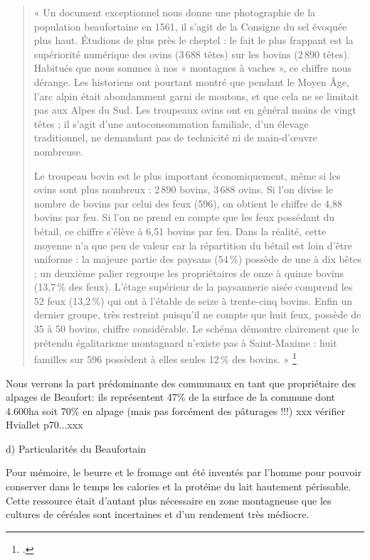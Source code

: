 \documentclass[12pt,a4paper]{report}
\begin{document}
	\begin{quote}
	« Un document exceptionnel nous donne une photographie de la population 
	beaufortaine en 1561, il s’agit de la Consigne du sel évoquée plus haut. 
	Étudions de plus près le cheptel : le fait le plus frappant est la supériorité 
	numérique des ovins (3\,688 têtes) sur les bovins (2\,890 têtes). Habitués que 
	nous sommes à nos « montagnes à vaches », ce chiffre nous dérange. Les historiens 
	ont pourtant montré que pendant le Moyen Âge, l’arc alpin était abondamment garni 
	de moutons, et que cela ne se limitait pas aux Alpes du Sud. Les troupeaux ovins 
	ont en général moins de vingt têtes ; il s’agit d’une autoconsommation familiale, 
	d’un élevage traditionnel, ne demandant pas de technicité ni de main-d’œuvre 
	nombreuse.
	
	Le troupeau bovin est le plus important économiquement, même si les ovins sont 
	plus nombreux : 2\,890 bovins, 3\,688 ovins. Si l’on divise le nombre de bovins 
	par celui des feux (596), on obtient le chiffre de 4,88 bovins par feu. Si l’on 
	ne prend en compte que les feux possédant du bétail, ce chiffre s’élève à 6,51 
	bovins par feu. Dans la réalité, cette moyenne n’a que peu de valeur car la 
	répartition du bétail est loin d’être uniforme : la majeure partie des paysans 
	(54\,\%) possède de une à dix bêtes ; un deuxième palier regroupe les propriétaires 
	de onze à quinze bovins (13,7\,\% des feux). L’étage supérieur de la paysannerie 
	aisée comprend les 52 feux (13,2\,\%) qui ont à l’étable de seize à trente-cinq 
	bovins. Enfin un dernier groupe, très restreint puisqu’il ne compte que huit feux, 
	possède de 35 à 50 bovins, chiffre considérable. Le schéma démontre clairement 
	que le prétendu égalitarisme montagnard n’existe pas à Saint-Maxime : huit familles 
	sur 596 possèdent à elles seules 12\,\% des bovins. »
	\footcite[90-92]{HViallet1993}
\end{quote}

Nous verrons la part prédominante des communaux en tant que propriétaire des alpages de Beaufort: ils représentent 47\% de la surface de la commune dont 4.600ha soit 70\% en alpage (mais pas forcément des pâturages !!!) xxx vérifier Hviallet p70...xxx

d)	Particularités du Beaufortain

Pour mémoire, le beurre et le fromage ont été inventés par l’homme pour pouvoir conserver dans le temps les calories et la protéine du lait hautement périssable. Cette ressource était d’autant plus nécessaire en zone montagneuse que les cultures de céréales sont incertaines et d’un rendement très médiocre.
\end{document}
